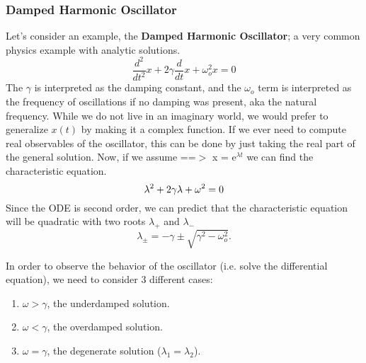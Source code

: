 \documentclass{article}
\newcommand{\be}{\begin{equation}}
\newcommand{\ee}{\end{equation}}
\newcommand{\benum}{\begin{enumerate}}
\newcommand{\eenum}{\end{enumerate}}
\begin{document}
\subsubsection*{Damped Harmonic Oscillator}
Let's consider an example, the \textbf{Damped Harmonic Oscillator}; a very common physics example with analytic solutions.
\be
\frac{d^2}{dt^2} x + 2\gamma \frac{d}{dt} x + \omega_o^2 x = 0
\ee
The $\gamma$ is interpreted as the damping constant, and the $\omega_o$ term is interpreted as the frequency of oscillations if no damping was present, aka the natural frequency.
While we do not live in an imaginary world, we would prefer to generalize $x(t)$ by making it a complex function.
If we ever need to compute real observables of the oscillator, this can be done by just taking the real part of the general solution.
Now, if we assume ==$>$ x = e$^{\lambda t}$ we can find the characteristic equation.
\be
\lambda^2 + 2\gamma\lambda  + \omega^2 = 0\\
\ee
Since the ODE is second order, we can predict that the characteristic equation will be quadratic with two roots $\lambda_+$ and $\lambda_-$
\be \label{eq:oscillator_char}
\lambda_{\pm} = -\gamma \pm \sqrt{\gamma^2 - \omega_o^2} .
\ee

In order to observe the behavior of the oscillator (i.e. solve the differential equation), we need to consider 3 different cases:
\benum
\item $\omega > \gamma$, the underdamped solution.
\item $\omega < \gamma$, the overdamped solution.
\item $\omega = \gamma$, the degenerate solution ($\lambda_1 = \lambda_2$).
\eenum
\end{document}
